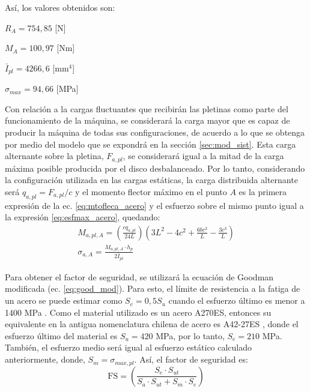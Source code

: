 Así, los valores obtenidos son:
\begin{itemize*}
	\item $R_A = 754,85$ [N]
	\item $M_A = 100,97$ [Nm]
	\item $\bar{I}_{pl} = 4266,6$ [mm$^4$]
	\item $\sigma_{max} = 94,66$ [MPa]
\end{itemize*}

Con relación a la cargas fluctuantes que recibirán las pletinas como parte del funcionamiento de la máquina, se considerará la carga mayor que es capaz de producir la máquina de todas sus configuraciones, de acuerdo a lo que se obtenga por medio del modelo que se expondrá en la sección \ref{sec:mod_sist}. Esta carga alternante sobre la pletina, $F_{a,pl}$, se considerará igual a la mitad de la carga máxima posible producida por el disco desbalanceado. Por lo tanto, considerando la configuración utilizada en las cargas estáticas, la carga distribuida alternante será $q_{a,pl} = F_{a,pl}/c$ y el momento flector máximo en el punto $A$ es la primera expresión de la ec. \ref{eq:mtofleca_acero} y el esfuerzo sobre el mismo punto igual a la expresión \ref{eq:esfmax_acero}, quedando: 
\begin{gather}
	M_{a,pl,A} = \left(\frac{cq_{a,pl}}{24L}\right) \left(3L^2 - 4c^2 + \frac{6bc^2}{L} - \frac{3c^3}{L}\right) \label{eq:mtofat_pletacero}\\
	\sigma_{a,A} = \frac{M_{a,pl,A} \cdot h_p}{2\bar{I}_{pl}} \label{eq:esffat_pletacero}
\end{gather}

Para obtener el factor de seguridad, se utilizará la ecuación de Goodman modificada (ec. \ref{eq:good_mod}). Para esto, el límite de resistencia a la fatiga de un acero se puede estimar como $S_e = 0,5S_{u}$ cuando el esfuerzo último es menor a 1400 MPa \cite{budynas2008shigley}. Como el material utilizado es un acero A270ES, entonces su equivalente en la antigua nomenclatura chilena de acero es A42-27ES \cite{nch203}, donde el esfuerzo último del material es $S_{u} = 420$ MPa, por lo tanto, $S_e = 210$ MPa. También, el esfuerzo medio será igual al esfuerzo estático calculado anteriormente, donde, $S_m = \sigma_{max,pl}$. Así, el factor de seguridad es:
\begin{equation}\label{eq:fs_fatacero}
	\text{FS} = \left(\frac{S_e\cdot S_{ut}}{S_a\cdot S_{ut} + S_m\cdot S_e}\right)
\end{equation}


